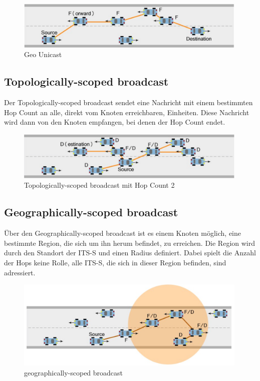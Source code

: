 \begin{figure}
	\includegraphics[width=0.99\textwidth]{content/images/03_networklayer/GeoUnicast.png}
	\caption{Geo Unicast \cite{etsi102636-1}}
	\label{fig:geounicast}
\end{figure}

\subsection{Topologically-scoped broadcast}
Der Topologically-scoped broadcast sendet eine Nachricht mit einem bestimmten Hop Count an alle, direkt vom  Knoten erreichbaren, Einheiten. Diese Nachricht wird dann von den Knoten empfangen, bei denen der Hop Count endet.

\begin{figure}
	\includegraphics[width=0.99\textwidth]{content/images/03_networklayer/TSC.png}
	\caption{Topologically-scoped broadcast mit Hop Count 2 \cite{etsi102636-1}}
	\label{fig:tsc}
\end{figure}


\subsection{Geographically-scoped broadcast}
Über den Geographically-scoped broadcast ist es einem Knoten möglich, eine bestimmte Region, die sich um ihn herum befindet, zu erreichen. Die Region wird durch den Standort der \ac{ITS-S} und einen Radius definiert. Dabei spielt die Anzahl der Hops keine Rolle, alle \ac{ITS-S}, die sich in dieser Region befinden, sind adressiert.

\begin{figure}
	\includegraphics[width=0.99\textwidth]{content/images/03_networklayer/GSB.png}
	\caption{geographically-scoped broadcast \cite{etsi102636-1}}
	\label{fig:gsb}
\end{figure}

